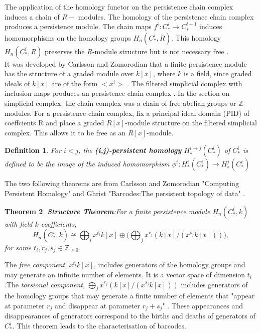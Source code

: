 \documentclass{article}
\newcommand{\be}{\begin{equation}}
\newcommand{\ee}{\end{equation}}
\newtheorem{theorem}{Theorem}[section]
\newtheorem{definition}[theorem]{Definition}
\begin{document}
The application of the homology functor on the persistence chain complex induces a chain of $R-$ modules. The homology of the persistence chain complex produces a persistence module. The chain maps $f^{i} : C^{i}_{*} \rightarrow C^{i+1}_{*}$ induces homomorphisms on the homology groups $H_n(C^{i}_{*}, R)$. This homology $H_n(C^{i}_{*}, R)$ preserves the $R$-module structure but is not necessary free \cite{Ghrist2007BarcodesTP}.\\

It was developed by Carlsson and Zomorodian \cite{AZComputePH} that a finite persistence module has the structure of a graded module over $k[x]$, where $k$ is a field, since graded ideals of $k[x]$ are of the form $<x^i>$ \cite{HSchenckAlgebraicFound}\cite{AZComputePH}.
The filtered simplicial complex with inclusion maps produces an persistence chain complex \cite{CarlssonAMS}\cite{AZComputePH}. In the section on simplicial complex, the chain complex was a chain of free abelian groups or $\mathbb{Z}$-modules. For a persistence chain complex, fix a principal ideal domain (PID) of coeffcients R and place a graded $R[x]$-module structure on the filtered simplicial complex. This allows it to be free as an $R[x]$-module.


\begin{definition}
For $i < j$, the \textbf{(i,j)-persistent homology} $H^{i\rightarrow j}_{*} (C^{i}_{*}) $ of $C^{i}_{*}$ is defined to be the image of the induced homomorphism $\phi^{i} : H^{i}_{*} (C^{i}_{*}) \rightarrow H^{j}_{*} (C^{i}_{*})$ 
\end{definition}

The two following theorems are from Carlsson and Zomorodian "Computing Persistent Homology" \cite{AZComputePH} and Ghrist "Barcodes:The persistent topology of data" \cite{Ghrist2007BarcodesTP}.
\begin{theorem}
\textbf{Structure Theorem}:For a finite persistence module $H_n(C^{i}_{*}, k)$ with field $k$ coefficients,
\be\label{StuctureTheorem}
H_n(C^{i}_{*}, k) \cong \bigoplus_{i} x^{t_i} k[x]\oplus \Biggl(\bigoplus_{j} x^{r_{j}} (k[x]/ (x^{s_j}k[x]))\Biggr),
\ee
for some $t_{i}, r_{j},s_{j} \in \mathbb{Z}_{\geq 0}$.
\end{theorem}

The \textit{free component}, $x^{t_i} k[x]$, includes generators of the homology groups and may generate an infinite number of elements. It is a vector space of dimension $t_{i}$.The \textit{torsional component}, $\bigoplus_{j} x^{r_{j}} (k[x]/ (x^{s_j}k[x]))$ includes generators of the homology groups that may generate a finite number of elements that "appear at parameter $r_{j}$ and disappear at parameter $r_{j} + s_{j}$" \cite{Ghrist2007BarcodesTP}. These appearances and disappearances of generators correspond to the births and deaths of generators of $C^{i}_{*}$. This theorem leads to the characterisation of barcodes.
\end{document}
